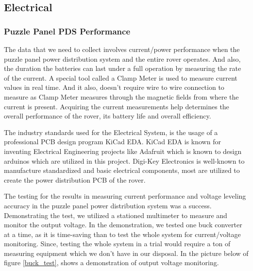\documentclass[a4paper, 10pt]{article}
\begin{document}
	\subsection{Electrical}

	\subsubsection*{Puzzle Panel PDS Performance}	

	The data that we need to collect involves current/power performance when the puzzle panel power distribution system and the entire rover operates. And also, the duration the batteries can last under a full operation by measuring the rate of the current. A special tool called a Clamp Meter is used to measure current values in real time. And it also, doesn't require wire to wire connection to measure as Clamp Meter measures through the magnetic fields from where the current is present. Acquiring the current measurements help determines the overall performance of the rover, its battery life and overall efficiency.

	The industry standards used for the Electrical System, is the usage of a professional PCB design program KiCad EDA. KiCad EDA is known for inventing Electrical Engineering projects like Adafruit which is known to design arduinos which are utilized in this project. Digi-Key Electronics is well-known to manufacture standardized and basic electrical components, most are utilized to create the power distribution PCB of the rover.

	The testing for the results in measuring current performance and voltage leveling accuracy in the puzzle panel power distribution system was a success. Demonstrating the test, we utilized a stationed multimeter to measure and monitor the output voltage. In the demonstration, we tested one buck converter at a time, as it is time-saving than to test the whole system for current/voltage monitoring. Since, testing the whole system in a trial would require a ton of measuring equipment which we don't have in our disposal. In the picture below of figure \ref{buck_test}, shows a demonstration of output voltage monitoring.  

\end{document}
